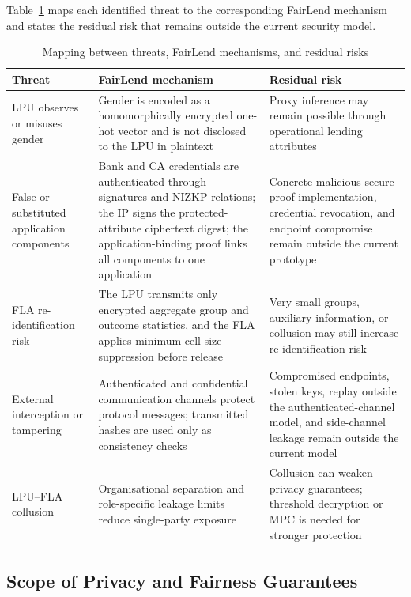 \documentclass[a4paper,fleqn]{cas-dc}
\begin{document}
\color{red}

Table~\ref{tab:threat_mapping} maps each identified threat to the corresponding FairLend mechanism and states the residual risk that remains outside the current security model.

\begin{table}[htbp]
\centering
\caption{Mapping between threats, FairLend mechanisms, and residual risks}
\label{tab:threat_mapping}
\scriptsize
\begin{tabular}{|p{3.5cm}|p{6.5cm}|p{5.5cm}|}
\hline
\textbf{Threat} & \textbf{FairLend mechanism} & \textbf{Residual risk} \\
\hline
LPU observes or misuses gender & Gender is encoded as a homomorphically encrypted one-hot vector and is not disclosed to the LPU in plaintext & Proxy inference may remain possible through operational lending attributes \\
False or substituted application components & Bank and CA credentials are authenticated through signatures and NIZKP relations; the IP signs the protected-attribute ciphertext digest; the application-binding proof links all components to one application & Concrete malicious-secure proof implementation, credential revocation, and endpoint compromise remain outside the current prototype \\
FLA re-identification risk
&
The LPU transmits only encrypted aggregate group and outcome statistics, and
the FLA applies minimum cell-size suppression before release
&
Very small groups, auxiliary information, or collusion may still increase
re-identification risk
\\
External interception or tampering & Authenticated and confidential communication channels protect protocol messages; transmitted hashes are used only as consistency checks & Compromised endpoints, stolen keys, replay outside the authenticated-channel model, and side-channel leakage remain outside the current model \\
LPU--FLA collusion & Organisational separation and role-specific leakage limits reduce single-party exposure & Collusion can weaken privacy guarantees; threshold decryption or MPC is needed for stronger protection \\
\hline
\end{tabular}
\end{table}

\subsection{Scope of Privacy and Fairness Guarantees}
\label{subsec:scope_guarantees}
\end{document}
